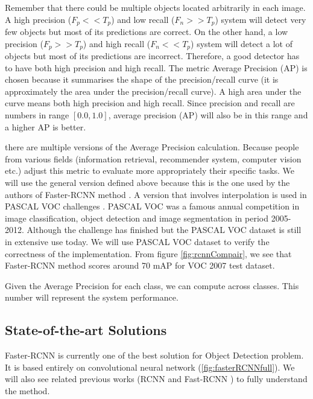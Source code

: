 Remember that there could be multiple objects located arbitrarily in each image. A high precision ($F_p << T_p$) and low recall ($F_n >> T_p$) system will detect very few objects but most of its predictions are correct. On the other hand, a low precision ($F_p >> T_p$) and high recall ($F_n << T_p$) system will detect a lot of objects but most of its predictions are incorrect. Therefore, a good detector has to have both high precision and high recall. The metric Average Precision (AP) is chosen because it summarises the shape of the precision/recall curve (it is approximately the area under the precision/recall curve). A high area under the curve means both high precision and high recall. Since precision and recall are numbers in range $[0.0, 1.0]$, average precision (AP) will also be in this range and a higher AP is better.

 there are multiple versions of the Average Precision calculation. Because people from various fields (information retrieval, recommender system, computer vision etc.) adjust this metric to evaluate more appropriately their specific tasks. We will use the general version defined above because this is the one used by the authors of Faster-RCNN method \cite{vocEval}. A version \cite{Everingham2010} that involves interpolation is used in PASCAL VOC challenges \cite{Everingham2010}. PASCAL VOC was a famous annual competition in image classification, object detection and image segmentation in period 2005-2012. Although the challenge has finished but the PASCAL VOC dataset is still in extensive use today. We will use PASCAL VOC dataset to verify the correctness of the implementation. From figure \ref{fig:rcnnCompair}, we see that Faster-RCNN method scores around 70 mAP for VOC 2007 test dataset.

Given the Average Precision for each class, we can compute  across classes. This number will represent the system performance.

\subsection{State-of-the-art Solutions}
Faster-RCNN \cite{DBLP:journals/corr/RenHG015} is currently one of the best solution for Object Detection problem. It is based entirely on convolutional neural network (\ref{fig:fasterRCNNfull}). We will also see related previous works (RCNN \cite{DBLP:journals/corr/GirshickDDM13} and Fast-RCNN \cite{DBLP:journals/corr/Girshick15}) to fully understand the method.

